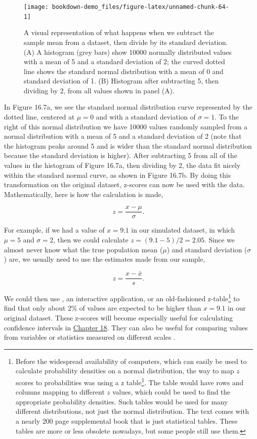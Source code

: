 \documentclass[
  openany]{krantz}
\renewcommand{\href}[2]{#2\footnote{\url{#1}}}
\begin{document}
\begin{figure}
\texttt{[image: bookdown-demo\_files/figure-latex/unnamed-chunk-64-1]} \caption{A visual representation of what happens when we subtract the sample mean from a dataset, then divide by its standard deviation. (A) A histogram (grey bars) show 10000 normally distributed values with a mean of 5 and a standard deviation of 2; the curved dotted line shows the standard normal distribution with a mean of 0 and standard deviation of 1. (B) Histogram after subtracting 5, then dividing by 2, from all values shown in panel (A).}\label{fig:unnamed-chunk-64}
\end{figure}

In Figure 16.7a, we see the standard normal distribution curve represented by the dotted line, centered at \(\mu = 0\) and with a standard deviation of \(\sigma = 1\).
To the right of this normal distribution we have 10000 values randomly sampled from a normal distribution with a mean of 5 and a standard deviation of 2 (note that the histogram peaks around 5 and is wider than the standard normal distribution because the standard deviation is higher).
After subtracting 5 from all of the values in the histogram of Figure 16.7a, then dividing by 2, the data fit nicely within the standard normal curve, as shown in Figure 16.7b.
By doing this transformation on the original dataset, z-scores can now be used with the data.
Mathematically, here is how the calculation is made,

\[z = \frac{x - \mu}{\sigma}.\]

For example, if we had a value of \(x = 9.1\) in our simulated dataset, in which \(\mu = 5\) and \(\sigma = 2\), then we could calculate \(z = (9.1 - 5) / 2 = 2.05\).
Since we almost never know what the true population mean (\(\mu\)) and standard deviation (\(\sigma\)) are, we usually need to use the estimates made from our sample,

\[z = \frac{x - \bar{x}}{s}.\]

We could then use \citep{Jamovi2022}, an interactive application, or an old-fashioned z-table\footnote{Before the widespread availability of computers, which can easily be used to calculate probability densities on a normal distribution, the way to map \(z\) scores to probabilities was using a \href{https://www.z-table.com/}{z table}. The table would have rows and columns mapping to different \(z\) values, which could be used to find the appropriate probability densities. Such tables would be used for many different distributions, not just the normal distribution. The text \citet{Sokal1995} comes with a nearly 200 page supplemental book that is just statistical tables. These tables are more or less obsolete nowadays, but some people still use them.} to find that only about 2\% of values are expected to be higher than \(x = 9.1\) in our original dataset.
These z-scores will become especially useful for calculating confidence intervals in \protect\hyperlink{Chapter_18}{Chapter 18}.
They can also be useful for comparing values from variables or statistics measured on different scales \citep{Sokal1995, Cheadle2003, Adams2016}.
\end{document}
